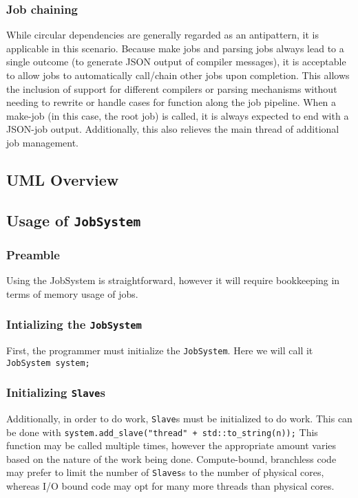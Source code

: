 \documentclass{article}
\begin{document}
		\subsubsection{Job chaining}
			While circular dependencies are generally regarded as an antipattern, it is applicable in this scenario. Because make jobs and parsing jobs always lead to a single outcome (to generate JSON output of compiler messages), it is acceptable to allow jobs to automatically call/chain other jobs upon completion. This allows the inclusion of support for different compilers or parsing mechanisms without needing to rewrite or handle cases for function along the job pipeline. When a make-job (in this case, the root job) is called, it is always expected to end with a JSON-job output. Additionally, this also relieves the main thread of additional job management.
	\subsection{UML Overview}
		
	\subsection{Usage of \texttt{JobSystem}}
		\subsubsection{Preamble}
			Using the JobSystem is straightforward, however it will require bookkeeping in terms of memory usage of jobs. 
		\subsubsection{Intializing the \texttt{JobSystem}}
			First, the programmer must initialize the \texttt{JobSystem}. Here we will call it \texttt{JobSystem system;}
		\subsubsection{Initializing \texttt{Slave}s}
			Additionally, in order to do work, \texttt{Slave}s must be initialized to do work. This can be done with \texttt{system.add\_slave("thread" + std::to\_string(n));} This function may be called multiple times, however the appropriate amount varies based on the nature of the work being done. Compute-bound, branchless code may prefer to limit the number of \texttt{Slaves}s to the number of physical cores, whereas I/O bound code may opt for many more threads than physical cores.
\end{document}
